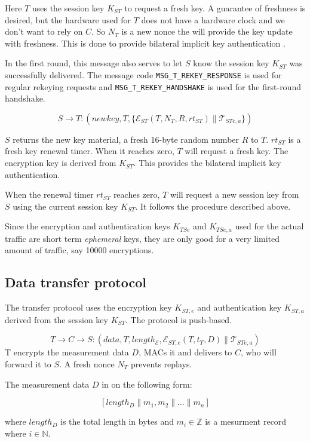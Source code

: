 Here $T$ uses the session key $K_{ST}$ to request a fresh key. A
guarantee of freshness is desired, but the hardware used for $T$ does
not have a hardware clock and we don't want to rely on $C$. So $N_T$
is a new nonce the will provide the key update with freshness. This is
done to provide bilateral implicit key authentication
\cite[pp.498]{menzes1996}.

In the first round, this message also serves to let $S$ know the
session key $K_{ST}$ was successfully delivered. The message code
\texttt{MSG\_T\_REKEY\_RESPONSE} is used for regular rekeying requests
and \texttt{MSG\_T\_REKEY\_HANDSHAKE} is used for the first-round handshake.

\[
S \rightarrow T: (newkey,T, \{ \mathcal{E}_{ST}(T,N_T,R,rt_{ST}) \parallel \mathcal{T}_{STe,a} \} )
\]

$S$ returns the new key material, a fresh 16-byte random number $R$ to
$T$.  $rt_{ST}$ is a fresh key renewal timer. When it reaches zero,
$T$ will request a fresh key. The encryption key is derived from
$K_{ST}$. This provides the bilateral implicit key authentication.

When the renewal timer $rt_{ST}$ reaches zero, $T$ will request a new
session key from $S$ using the current session key $K_{ST}$. It
follows the procedure described above.

Since the encryption and authentication keys $K_{TSe}$ and $K_{TSe,a}$
used for the actual traffic are short term \textit{ephemeral} keys,
they are only good for a very limited amount of traffic, say 10000
encryptions.

\subsection{Data transfer protocol}

The transfer protocol uses the encryption key $K_{ST,e}$ and authentication key $K_{ST,a}$
derived from the session key $K_{ST}$. The protocol is push-based.

\[
T \rightarrow C \rightarrow S: (\textit{data},T,length_{\mathcal{E}},\mathcal{E}_{ST,e}(T,t_T,D) \parallel \mathcal{T}_{STe,a})
\]
T encrypts the measurement data $D$, MACs it and delivers to
$C$, who will forward it to $S$. A fresh nonce $N_T$ prevents
replays.

The measurement data $D$ in on the following form:

\[
[ length_D \parallel m_1, m_2 \parallel \dots \parallel m_n ]
\]

where $length_D$ is the total length in bytes and $m_i \in \mathbb{Z}$ is a mesurment
record where $i \in \mathbb{N}$. 

